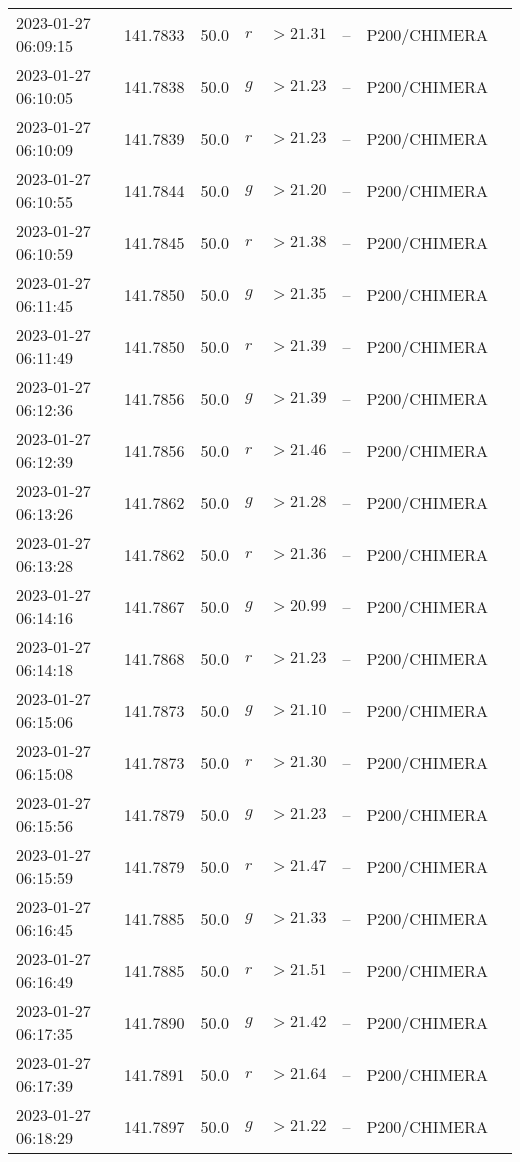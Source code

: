 \documentclass{nature_plusfigure}
\begin{document}
\begin{supplement}
\begin{center}
\begin{longtable}{llllllll}
2023-01-27 06:09:15 & 141.7833 & 50.0 & $r$ & $>21.31$ & -- & P200/CHIMERA &  \\ 
2023-01-27 06:10:05 & 141.7838 & 50.0 & $g$ & $>21.23$ & -- & P200/CHIMERA &  \\ 
2023-01-27 06:10:09 & 141.7839 & 50.0 & $r$ & $>21.23$ & -- & P200/CHIMERA &  \\ 
2023-01-27 06:10:55 & 141.7844 & 50.0 & $g$ & $>21.20$ & -- & P200/CHIMERA &  \\ 
2023-01-27 06:10:59 & 141.7845 & 50.0 & $r$ & $>21.38$ & -- & P200/CHIMERA &  \\ 
2023-01-27 06:11:45 & 141.7850 & 50.0 & $g$ & $>21.35$ & -- & P200/CHIMERA &  \\ 
2023-01-27 06:11:49 & 141.7850 & 50.0 & $r$ & $>21.39$ & -- & P200/CHIMERA &  \\ 
2023-01-27 06:12:36 & 141.7856 & 50.0 & $g$ & $>21.39$ & -- & P200/CHIMERA &  \\ 
2023-01-27 06:12:39 & 141.7856 & 50.0 & $r$ & $>21.46$ & -- & P200/CHIMERA &  \\ 
2023-01-27 06:13:26 & 141.7862 & 50.0 & $g$ & $>21.28$ & -- & P200/CHIMERA &  \\ 
2023-01-27 06:13:28 & 141.7862 & 50.0 & $r$ & $>21.36$ & -- & P200/CHIMERA &  \\ 
2023-01-27 06:14:16 & 141.7867 & 50.0 & $g$ & $>20.99$ & -- & P200/CHIMERA &  \\ 
2023-01-27 06:14:18 & 141.7868 & 50.0 & $r$ & $>21.23$ & -- & P200/CHIMERA &  \\ 
2023-01-27 06:15:06 & 141.7873 & 50.0 & $g$ & $>21.10$ & -- & P200/CHIMERA &  \\ 
2023-01-27 06:15:08 & 141.7873 & 50.0 & $r$ & $>21.30$ & -- & P200/CHIMERA &  \\ 
2023-01-27 06:15:56 & 141.7879 & 50.0 & $g$ & $>21.23$ & -- & P200/CHIMERA &  \\ 
2023-01-27 06:15:59 & 141.7879 & 50.0 & $r$ & $>21.47$ & -- & P200/CHIMERA &  \\ 
2023-01-27 06:16:45 & 141.7885 & 50.0 & $g$ & $>21.33$ & -- & P200/CHIMERA &  \\ 
2023-01-27 06:16:49 & 141.7885 & 50.0 & $r$ & $>21.51$ & -- & P200/CHIMERA &  \\ 
2023-01-27 06:17:35 & 141.7890 & 50.0 & $g$ & $>21.42$ & -- & P200/CHIMERA &  \\ 
2023-01-27 06:17:39 & 141.7891 & 50.0 & $r$ & $>21.64$ & -- & P200/CHIMERA &  \\ 
2023-01-27 06:18:29 & 141.7897 & 50.0 & $g$ & $>21.22$ & -- & P200/CHIMERA &  \\ 

\end{longtable}
\end{center}
\end{supplement}
\end{document}
